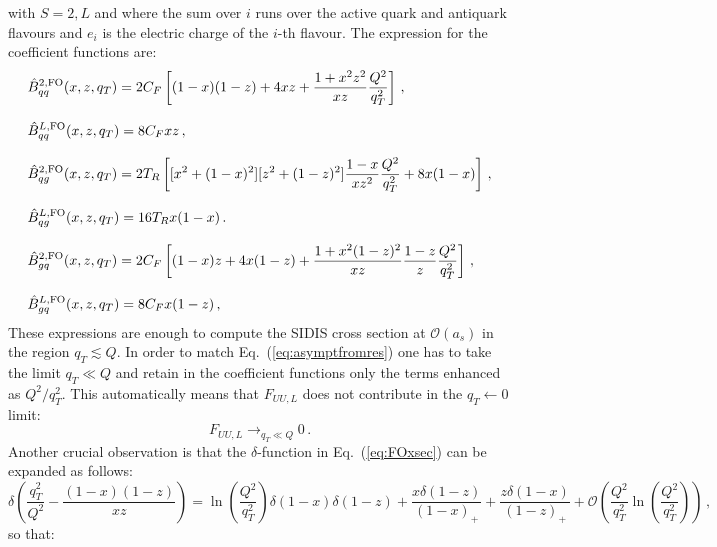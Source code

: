 \documentclass[10pt,a4paper]{article}
\begin{document}
with $S=2,L$ and where the sum over $i$ runs over the active quark and
antiquark flavours and $e_i$ is the electric charge of the $i$-th
flavour. The expression for the coefficient functions are:
\begin{equation}\label{eq:Bacchettaetal}
\begin{array}{l}
\displaystyle \hat{B}_{qq}^{2,\rm FO}(x,z,q_T) = 2C_F\left[(1-x)(1-z)+4xz+\frac{1+x^2z^2}{xz}\frac{Q^2}{q_T^2}\right]\,,\\
\\
\displaystyle \hat{B}_{qq}^{L,\rm FO}(x,z,q_T) = 8C_Fxz\,,\\
\\
\displaystyle \hat{B}_{qg}^{2,\rm FO}(x,z,q_T) = 2T_R\left[[x^2+(1-x)^2][z^2+(1-z)^2]\frac{1-x}{xz^2}\frac{Q^2}{q_T^2} +8x(1-x)\right]\,,\\
\\
\displaystyle \hat{B}_{qg}^{L,\rm FO}(x,z,q_T) = 16T_Rx(1-x)\,.\\
\\
\displaystyle \hat{B}_{gq}^{2,\rm FO}(x,z,q_T) = 2C_F\left[(1-x)z+4x(1-z)+\frac{1+x^2(1-z)^2}{xz}\frac{1-z}{z}\frac{Q^2}{q_T^2}\right]\,,\\
\\
\displaystyle \hat{B}_{gq}^{L,\rm FO}(x,z,q_T) = 8C_Fx(1-z)\,,
\end{array}
\end{equation}
These expressions are enough to compute the SIDIS cross section at
$\mathcal{O}(a_s)$ in the region $q_T \lesssim Q$. In order to match
Eq.~(\ref{eq:asymptfromres}) one has to take the limit $q_T\ll Q$ and
retain in the coefficient functions only the terms enhanced as
$Q^2/q_T^2$. This automatically means that $F_{UU,L}$ does not
contribute in the $q_T\leftarrow 0$ limit:
\begin{equation}
F_{UU,L}\mathop{\longrightarrow}_{q_T\ll Q} 0\,.
\end{equation}
Another crucial observation is that the $\delta$-function in
Eq.~(\ref{eq:FOxsec}) can be expanded as follows:
\begin{equation}
  \delta\left(\frac{q_T^2}{Q^2}-\frac{(1-x)(1-z)}{xz}\right)
  =\ln\left(\frac{Q^2}{q_T^2}\right)\delta(1-x) \delta(1-z) +
  \frac{x\delta(1-z)}{(1-x)_+}+ \frac{z\delta(1-x)}{(1-z)_+} +\mathcal{O}\left(\frac{Q^2}{q_T^2}\ln\left(\frac{Q^2}{q_T^2}\right)\right)\,,
\end{equation}
so that:
\end{document}
